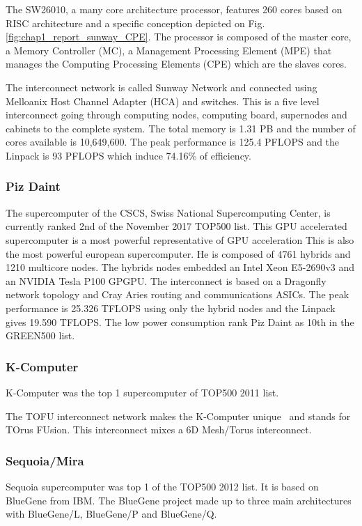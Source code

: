 The SW26010, a many core architecture processor, features 260 cores based on RISC architecture and a specific conception depicted on Fig.\ref{fig:chap1_report_sunway_CPE}. 
The processor is composed of the master core, a Memory Controller (MC), a Management Processing Element (MPE) that manages the Computing Processing Elements (CPE) which are the slaves cores. 

The interconnect network is called Sunway Network and connected using Melloanix Host Channel Adapter (HCA) and switches. 
This is a five level interconnect going through computing nodes, computing board, supernodes and cabinets to the complete system.
The total memory is 1.31 PB and the number of cores available is 10,649,600.
The peak performance is 125.4 PFLOPS and the Linpack is 93 PFLOPS which induce 74.16\% of efficiency. 

\subsubsection{Piz Daint}
The supercomputer of the CSCS, Swiss National Supercomputing Center, is currently ranked 2nd of the November 2017 TOP500 list. 
This GPU accelerated supercomputer is a most powerful representative of GPU acceleration
This is also the most powerful european supercomputer. 
He is composed of 4761 hybrids and 1210 multicore nodes. 
The hybrids nodes embedded an Intel Xeon E5-2690v3 and an NVIDIA Tesla P100 GPGPU. 
The interconnect is based on a Dragonfly network topology and Cray Aries routing and communications ASICs. 
The peak performance is 25.326 TFLOPS using only the hybrid nodes and the Linpack gives 19.590 TFLOPS.
The low power consumption rank Piz Daint as 10th in the GREEN500 list. 

\subsubsection{K-Computer}
K-Computer was the top 1 supercomputer of TOP500 2011 list. 

The TOFU interconnect network makes the K-Computer unique~\cite{ajima2009tofu} and stands for TOrus FUsion.
This interconnect mixes a 6D Mesh/Torus interconnect.

\subsubsection{Sequoia/Mira}
Sequoia supercomputer was top 1 of the TOP500 2012 list. 
It is based on BlueGene from IBM.
The BlueGene project made up to three main architectures with BlueGene/L, BlueGene/P and BlueGene/Q.

